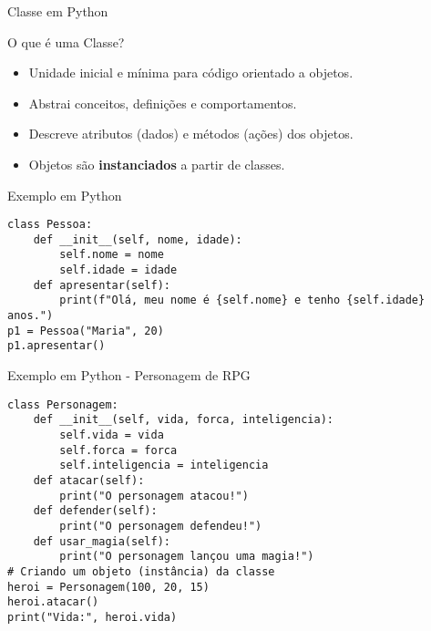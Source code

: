 \begin{frame}[fragile]{Classe em Python}

\begin{block}{O que é uma Classe?}
\begin{itemize}
    \item Unidade inicial e mínima para código orientado a objetos.
    \item Abstrai conceitos, definições e comportamentos.
    \item Descreve atributos (dados) e métodos (ações) dos objetos.
    \item Objetos são \textbf{instanciados} a partir de classes.
\end{itemize}
\end{block}

\begin{block}{Exemplo em Python}
\begin{verbatim}
class Pessoa:
    def __init__(self, nome, idade):
        self.nome = nome
        self.idade = idade
    def apresentar(self):
        print(f"Olá, meu nome é {self.nome} e tenho {self.idade} anos.")
p1 = Pessoa("Maria", 20)
p1.apresentar()
\end{verbatim}
\end{block}

\end{frame}

\begin{frame}[fragile]{Exemplo em Python - Personagem de RPG}

\begin{verbatim}
class Personagem:
    def __init__(self, vida, forca, inteligencia):
        self.vida = vida
        self.forca = forca
        self.inteligencia = inteligencia
    def atacar(self):
        print("O personagem atacou!")
    def defender(self):
        print("O personagem defendeu!")
    def usar_magia(self):
        print("O personagem lançou uma magia!")
# Criando um objeto (instância) da classe
heroi = Personagem(100, 20, 15)
heroi.atacar()
print("Vida:", heroi.vida)
\end{verbatim}

\end{frame}


